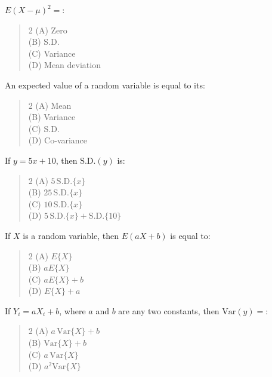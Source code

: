 \documentclass[11pt,a4paper]{article}
\begin{document}
\begin{mcqlist}
\item $E(X-\mu)^2 = $\underline{\hspace{1.5cm}}:
\begin{quote}\begin{multicols}{2}
\noindent (A) Zero \\
(B) S.D. \\
(C) Variance \\
(D) Mean deviation
\end{multicols}\end{quote}

\item An expected value of a random variable is equal to its:
\begin{quote}\begin{multicols}{2}
\noindent (A) Mean \\
(B) Variance \\
(C) S.D. \\
(D) Co-variance
\end{multicols}\end{quote}

\item If $y=5x+10$, then $\mathrm{S.D.}(y)$ is:
\begin{quote}\begin{multicols}{2}
\noindent (A) $5\,\mathrm{S.D.}\{x\}$ \\
(B) $25\,\mathrm{S.D.}\{x\}$ \\
(C) $10\,\mathrm{S.D.}\{x\}$ \\
(D) $5\,\mathrm{S.D.}\{x\}+\mathrm{S.D.}\{10\}$
\end{multicols}\end{quote}

\item If $X$ is a random variable, then $E(aX+b)$ is equal to:
\begin{quote}\begin{multicols}{2}
\noindent (A) $E\{X\}$ \\
(B) $aE\{X\}$ \\
(C) $aE\{X\}+b$ \\
(D) $E\{X\}+a$
\end{multicols}\end{quote}

\item If $Y_i=aX_i+b$, where $a$ and $b$ are any two constants, then $\mathrm{Var}(y)=$:
\begin{quote}\begin{multicols}{2}
\noindent (A) $a\,\mathrm{Var}\{X\}+b$ \\
(B) $\mathrm{Var}\{X\}+b$ \\
(C) $a\,\mathrm{Var}\{X\}$ \\
(D) $a^2\mathrm{Var}\{X\}$
\end{multicols}\end{quote}


\end{mcqlist}
\end{document}
